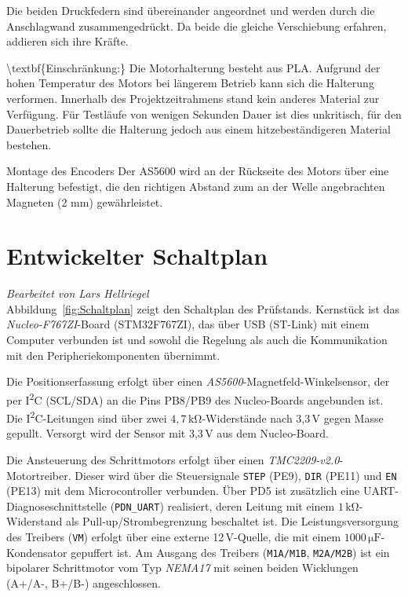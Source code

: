 Die beiden Druckfedern sind übereinander angeordnet und werden durch die Anschlagwand zusammengedrückt. Da beide die gleiche Verschiebung erfahren, addieren sich ihre Kräfte.

\textbackslash{}textbf\{Einschränkung:\} Die Motorhalterung besteht aus PLA. Aufgrund der hohen Temperatur des Motors bei längerem Betrieb kann sich die Halterung verformen. Innerhalb des Projektzeitrahmens stand kein anderes Material zur Verfügung. Für Testläufe von wenigen Sekunden Dauer ist dies unkritisch, für den Dauerbetrieb sollte die Halterung jedoch aus einem hitzebeständigeren Material bestehen.

Montage des Encoders
Der AS5600 wird an der Rückseite des Motors über eine Halterung befestigt, die den richtigen Abstand zum an der Welle angebrachten Magneten (2 mm) gewährleistet.

\section{Entwickelter Schaltplan}
\textit{Bearbeitet von Lars Hellriegel}\\

Abbildung~\ref{fig:Schaltplan} zeigt den Schaltplan des Prüfstands. Kernstück ist das \textit{Nucleo-F767ZI}-Board (STM32F767ZI), das über USB (ST-Link) mit einem Computer verbunden ist und sowohl die Regelung als auch die Kommunikation mit den Peripheriekomponenten übernimmt.

Die Positionserfassung erfolgt über einen \textit{AS5600}-Magnetfeld-Winkelsensor, der per I\textsuperscript{2}C (SCL/SDA) an die Pins PB8/PB9 des Nucleo-Boards angebunden ist. Die I\textsuperscript{2}C-Leitungen sind über zwei $4{,}7\,\mathrm{k\Omega}$-Widerstände nach 3,3\,V gegen Masse gepullt. Versorgt wird der Sensor mit 3,3\,V aus dem Nucleo-Board.

Die Ansteuerung des Schrittmotors erfolgt über einen \textit{TMC2209-v2.0}-Motortreiber. Dieser wird über die Steuersignale \texttt{STEP} (PE9), \texttt{DIR} (PE11) und \texttt{EN} (PE13) mit dem Microcontroller verbunden. Über PD5 ist zusätzlich eine UART-Diagnoseschnittstelle (\texttt{PDN\_UART}) realisiert, deren Leitung mit einem $1\,\mathrm{k\Omega}$-Widerstand als Pull-up/Strombegrenzung beschaltet ist. Die Leistungsversorgung des Treibers (\texttt{VM}) erfolgt über eine externe 12\,V-Quelle, die mit einem $1000\,\mathrm{\mu F}$-Kondensator gepuffert ist. Am Ausgang des Treibers (\texttt{M1A/M1B}, \texttt{M2A/M2B}) ist ein bipolarer Schrittmotor vom Typ \textit{NEMA17} mit seinen beiden Wicklungen (A+/A-, B+/B-) angeschlossen.

